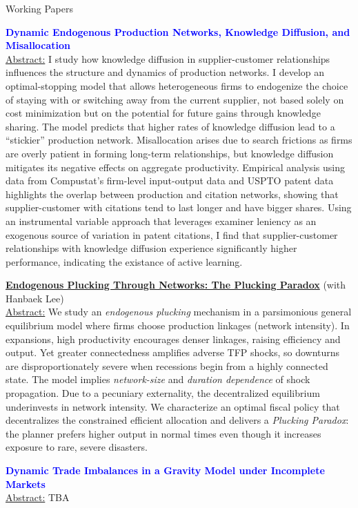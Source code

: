 \documentclass{resume}
\begin{document}
\begin{rSection}{Working Papers}


\textcolor{blue}{\textbf{Dynamic Endogenous Production Networks, Knowledge Diffusion, and Misallocation}}
\\
\small
\underline{Abstract:} I study how knowledge diffusion in supplier-customer relationships influences the structure and dynamics of production networks.
    I develop an optimal-stopping model that allows heterogeneous firms to endogenize the choice of staying with or switching away from the current supplier, 
    not based solely on cost minimization but on the potential for future gains through knowledge sharing. 
    The model predicts that higher rates of knowledge diffusion lead to a ``stickier'' production network. 
    Misallocation arises due to search frictions as firms are overly patient in forming long-term relationships, but knowledge diffusion mitigates its negative effects on aggregate productivity.
    Empirical analysis using data from Compustat's firm-level input-output data and USPTO patent data highlights the overlap between production and citation networks, showing that supplier-customer with citations tend to last longer and have bigger shares. Using an instrumental variable approach that leverages examiner leniency as an exogenous source of variation in patent citations, I find that supplier-customer relationships with knowledge diffusion experience significantly higher performance, indicating the existance of active learning. 

\normalsize
\href{https://hanbaeklee.github.io/Webpage/Lee_Sun_2026.pdf}{\textbf{Endogenous Plucking Through Networks: The Plucking Paradox}}{} (with Hanbaek Lee)
\\
\small
\underline{Abstract:} We study an \textit{endogenous plucking} mechanism in a parsimonious general equilibrium model where firms choose production linkages (network intensity). In expansions, high productivity encourages denser linkages, raising efficiency and output. Yet greater connectedness amplifies adverse TFP shocks, so downturns are disproportionately severe when recessions begin from a highly connected state. The model implies \textit{network-size} and \textit{duration dependence} of shock propagation. Due to a pecuniary externality, the decentralized equilibrium underinvests in network intensity. We characterize an optimal fiscal policy that decentralizes the constrained efficient allocation and delivers a \textit{Plucking Paradox}: the planner prefers higher output in normal times even though it increases exposure to rare, severe disasters.

\normalsize
\textcolor{blue}{\textbf{Dynamic Trade Imbalances in a Gravity Model under Incomplete Markets}}
\\
\small
\underline{Abstract:} TBA
\end{rSection}
\end{document}
